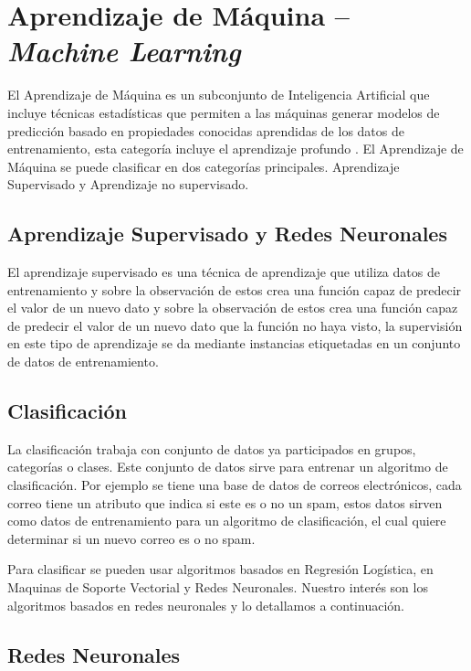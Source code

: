  
 
\section{Aprendizaje de Máquina -- \textit{Machine Learning} }\label{sec:machine-learning}

El Aprendizaje de Máquina es un subconjunto de Inteligencia Artificial  que incluye técnicas estadísticas que permiten a las máquinas generar modelos de predicción  basado en propiedades conocidas aprendidas de los datos de entrenamiento, esta categoría incluye el aprendizaje profundo \cite{smola2008ml, TheMLBook}. El Aprendizaje de Máquina se puede clasificar en dos categorías principales. Aprendizaje Supervisado y Aprendizaje no supervisado. 

\subsection{Aprendizaje Supervisado y Redes Neuronales}

El aprendizaje supervisado es una técnica de aprendizaje que utiliza datos de entrenamiento y sobre la observación de estos crea una función capaz de predecir el valor de un nuevo dato y sobre la observación de estos crea una función capaz de predecir el valor de un nuevo dato que la función no haya visto, la supervisión en este tipo de aprendizaje se da mediante instancias etiquetadas en un conjunto de datos de entrenamiento. 

\subsection*{Clasificación}

La clasificación trabaja con conjunto de datos ya participados en grupos, categorías o clases. Este conjunto de datos sirve para entrenar un algoritmo de clasificación. Por ejemplo se tiene una base de datos de correos electrónicos, cada correo tiene un atributo que indica si este es o no un spam, estos datos sirven como datos de entrenamiento para un algoritmo de clasificación, el cual quiere determinar si un nuevo correo es o no spam. 

Para clasificar se pueden usar algoritmos basados en Regresión Logística, en Maquinas de Soporte Vectorial y Redes Neuronales. Nuestro interés son los algoritmos basados en redes neuronales y lo detallamos a continuación.

\subsection*{Redes Neuronales}

